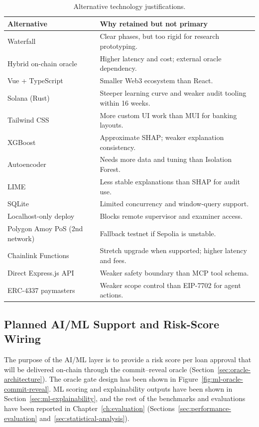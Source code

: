 \begin{table}[H]
\centering
\caption[Alternative technology justifications]{Alternative technology justifications.}
\label{tab:tech-justification-alternatives}
\small
\begin{tabular}{@{}p{3.2cm}p{9.8cm}@{}}
\toprule
\tableheadcolor
\textbf{Alternative} & \textbf{Why retained but not primary} \\
\midrule
Waterfall & Clear phases, but too rigid for research prototyping. \\
Hybrid on-chain oracle & Higher latency and cost; external oracle dependency. \\
Vue + TypeScript & Smaller Web3 ecosystem than React. \\
Solana (Rust) & Steeper learning curve and weaker audit tooling within 16 weeks. \\
Tailwind CSS & More custom UI work than MUI for banking layouts. \\
XGBoost & Approximate SHAP; weaker explanation consistency. \\
Autoencoder & Needs more data and tuning than Isolation Forest. \\
LIME & Less stable explanations than SHAP for audit use. \\
SQLite & Limited concurrency and window-query support. \\
Localhost-only deploy & Blocks remote supervisor and examiner access. \\
Polygon Amoy PoS (2nd network) & Fallback testnet if Sepolia is unstable. \\
Chainlink Functions & Stretch upgrade when supported; higher latency and fees. \\
Direct Express.js API & Weaker safety boundary than MCP tool schema. \\
ERC-4337 paymasters & Weaker scope control than EIP-7702 for agent actions. \\
\bottomrule
\end{tabular}
\end{table}

\subsection{Planned AI/ML Support and Risk-Score Wiring}
\label{sec:aiml-support}

The purpose of the AI/ML layer is to provide a risk score per loan approval that will be delivered on-chain through the commit--reveal oracle (Section~\ref{sec:oracle-architecture}). The oracle gate design has been shown in Figure~\ref{fig:ml-oracle-commit-reveal}. ML scoring and explainability outputs have been shown in Section~\ref{sec:ml-explainability}, and the rest of the benchmarks and evaluations have been reported in Chapter~\ref{ch:evaluation} (Sections~\ref{sec:performance-evaluation} and~\ref{sec:statistical-analysis}).

